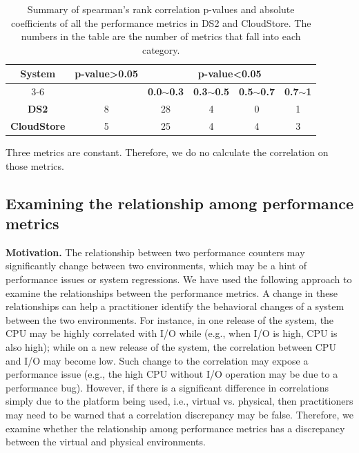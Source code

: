 \documentclass[smallextended]{svjour3}       %
\begin{document}
\begin{table}[tbh]
	\centering
	\caption{Summary of spearman's rank correlation p-values and absolute coefficients of all the performance metrics in DS2 and CloudStore. The numbers in the table are the number of metrics that fall into each category.}
	\label{tab:correlationall}
	\begin{threeparttable}
		
		\begin{tabular}{|c||c|c|c|c|c|}
			\hline
			\multirow{3}{*}{\textbf{System}} & \multirow{3}{*}{\textbf{p-value\textgreater0.05}} & \multicolumn{4}{c|}{\textbf{p-value\textless0.05}} \\ \cline{3-6} 
			&  & \textbf{0.0$\sim$0.3} & \textbf{0.3$\sim$0.5} & \textbf{0.5$\sim$0.7} & \textbf{0.7$\sim$1} \\ %
			\midrule 
			\midrule 
			\textbf{DS2} & 8 & 28 & 4 & 0 & 1 \\ \hline
			\textbf{CloudStore} & 5 & 25 & 4 & 4 & 3 \\ \hline
		\end{tabular}%
		\begin{tablenotes}
			\item Three metrics are constant. Therefore, we do no calculate the correlation on those metrics.
		\end{tablenotes}
	\end{threeparttable}
	
\end{table}



\subsection{Examining the relationship among performance metrics}
\label{sec:relation}
\noindent \textbf{Motivation.}
The relationship between two performance counters may significantly change between two environments, which may be a hint of performance issues or system regressions. We have used the following approach to examine the relationships between the performance metrics. A change in these relationships can help a practitioner identify the behavioral changes of a system between the two environments. For instance, in one release of the system, the CPU may be highly correlated with I/O while (e.g., when I/O is high, CPU is also high); while on a new release of the system, the correlation between CPU and I/O may become low. Such change to the correlation may expose a performance issue (e.g., the high CPU without I/O operation may be due to a performance bug). However, if there is a significant difference in correlations simply due to the platform being used, i.e., virtual vs. physical, then practitioners may need to be warned that a correlation discrepancy may be false. Therefore, we examine whether the relationship among performance metrics has a discrepancy between the virtual and physical environments. 
\end{document}
